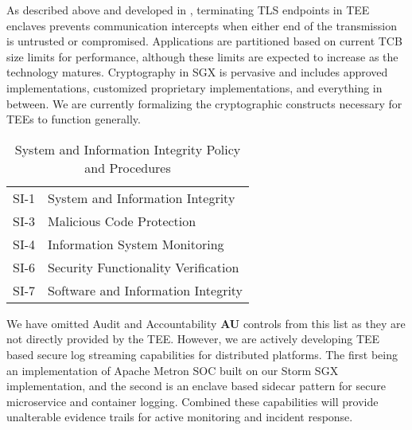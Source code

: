 As described above and developed in \cite{sgx-lkl_2018, Priebe_Muthukumaran_Lind_Zhu_Cui_Sartakov_Pietzuch_2019}, terminating TLS endpoints in TEE enclaves prevents communication intercepts when either end of the transmission is untrusted or compromised. Applications are partitioned based on current TCB size limits for performance, although these limits are expected to increase as the technology matures. Cryptography in SGX is pervasive and includes approved implementations, customized proprietary implementations, and everything in between. We are currently formalizing the cryptographic constructs necessary for TEEs to function generally.

\begin{table}[H]
\centering
\caption{System and Information Integrity Policy and Procedures}
\label{tab:controls_si}
\begin{tabular}{@{}ll@{}}
\toprule
SI-1 & System and Information Integrity  \\
SI-3 & Malicious Code Protection \\
SI-4 & Information System Monitoring \\
SI-6 & Security Functionality Verification \\
SI-7 & Software and Information Integrity \\
\bottomrule
\end{tabular}
\end{table}

We have omitted Audit and Accountability \textbf{AU} controls from this list as they are not directly provided by the TEE. However, we are actively developing TEE based secure log streaming capabilities for distributed platforms. The first being an implementation of Apache Metron SOC built on our Storm SGX implementation, and the second is an enclave based sidecar pattern for secure microservice and container logging. Combined these capabilities will provide unalterable evidence trails for active monitoring and incident response.
